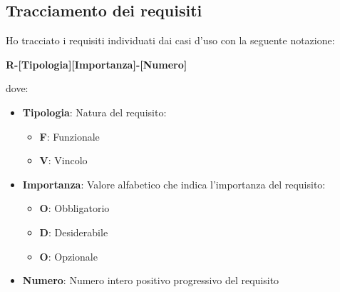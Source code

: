 \subsection{Tracciamento dei requisiti}
Ho tracciato i requisiti individuati dai casi d'uso con la seguente notazione:
\begin{center}
    \textbf{R-[Tipologia][Importanza]-[Numero]}
\end{center}
dove: 
\begin{itemize}
    \item \textbf{Tipologia}: Natura del requisito: \begin{itemize}
        \item \textbf{F}: Funzionale
        \item \textbf{V}: Vincolo
    \end{itemize}
    \item \textbf{Importanza}: Valore alfabetico che indica l'importanza del requisito: \begin{itemize}
        \item \textbf{O}: Obbligatorio
        \item \textbf{D}: Desiderabile
        \item \textbf{O}: Opzionale
    \end{itemize}
    \item \textbf{Numero}: Numero intero positivo progressivo del requisito
\end{itemize}

